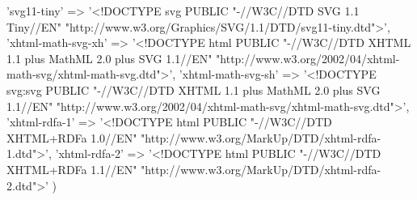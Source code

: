 \begin{DoxyCode}
    \textcolor{stringliteral}{'svg11-tiny'} => \textcolor{stringliteral}{'<!DOCTYPE svg PUBLIC "-//W3C//DTD SVG 1.1 Tiny//EN"
       "http://www.w3.org/Graphics/SVG/1.1/DTD/svg11-tiny.dtd">'},
    \textcolor{stringliteral}{'xhtml-math-svg-xh'} => \textcolor{stringliteral}{'<!DOCTYPE html PUBLIC "-//W3C//DTD XHTML 1.1 plus MathML 2.0 plus SVG 1.1//EN"
       "http://www.w3.org/2002/04/xhtml-math-svg/xhtml-math-svg.dtd">'},
    \textcolor{stringliteral}{'xhtml-math-svg-sh'} => \textcolor{stringliteral}{'<!DOCTYPE svg:svg PUBLIC "-//W3C//DTD XHTML 1.1 plus MathML 2.0 plus SVG
       1.1//EN" "http://www.w3.org/2002/04/xhtml-math-svg/xhtml-math-svg.dtd">'},
    \textcolor{stringliteral}{'xhtml-rdfa-1'} => \textcolor{stringliteral}{'<!DOCTYPE html PUBLIC "-//W3C//DTD XHTML+RDFa 1.0//EN"
       "http://www.w3.org/MarkUp/DTD/xhtml-rdfa-1.dtd">'},
    \textcolor{stringliteral}{'xhtml-rdfa-2'} => \textcolor{stringliteral}{'<!DOCTYPE html PUBLIC "-//W3C//DTD XHTML+RDFa 1.1//EN"
       "http://www.w3.org/MarkUp/DTD/xhtml-rdfa-2.dtd">'}
)
\end{DoxyCode}
